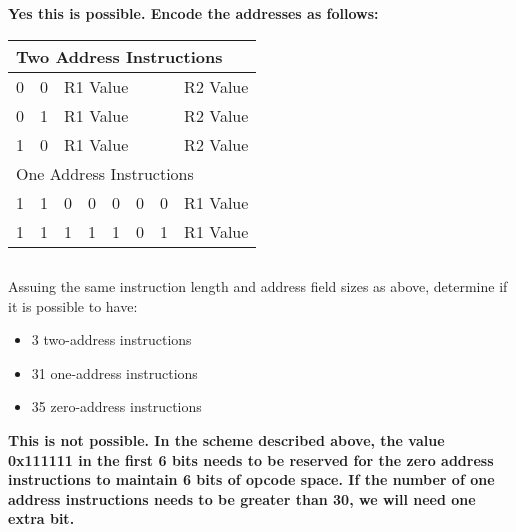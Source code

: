 \documentclass{article}
\begin{document}
    \textbf{Yes this is possible. Encode the addresses as follows:} \\
    \begin{tabular}{|l|l|l|l|l|l|l|l|l|l|l|l|}
    \hline
    \multicolumn{12}{|l|}{Two Address Instructions}\\
    \hline
    0 & 0 & \multicolumn{5}{|l|}{R1 Value} & \multicolumn{5}{|l|}{R2 Value} \\
    0 & 1 & \multicolumn{5}{|l|}{R1 Value} & \multicolumn{5}{|l|}{R2 Value} \\
    1 & 0 & \multicolumn{5}{|l|}{R1 Value} & \multicolumn{5}{|l|}{R2 Value}\\
    \hline
    \multicolumn{12}{|l|}{One Address Instructions}\\
    \hline
    1 & 1 & 0 & 0 & 0 & 0 & 0 & \multicolumn{5}{|l|}{R1 Value}\\
    1 & 1 & 1 & 1 & 1 & 0 & 1 & \multicolumn{5}{|l|}{R1 Value}\\
    \end{tabular}
\subsection{}
Assuing the same instruction length and address field sizes as above, determine if it is possible to have:
\begin{itemize}
    \item 3 two-address instructions
    \item 31 one-address instructions
    \item 35 zero-address instructions
\end{itemize}
\vspace{5mm}
\textbf{This is not possible. In the scheme described above, the value 0x111111 in the first 6 bits needs to be reserved for the zero address instructions to maintain 6 bits of opcode space. If the number of one address instructions needs to be greater than 30, we will need one extra bit.}
\end{document}
